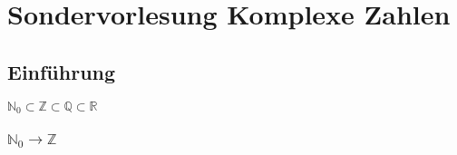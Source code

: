 \section{Sondervorlesung Komplexe Zahlen}
%
%
%
\subsection{Einführung}
$\mathbb{N}_{0}\subset\mathbb{Z}\subset\mathbb{Q}\subset\mathbb{R}$
%
%
%
\subsubsection{$\mathbb{N}_{0}\rightarrow\mathbb{Z}$}
